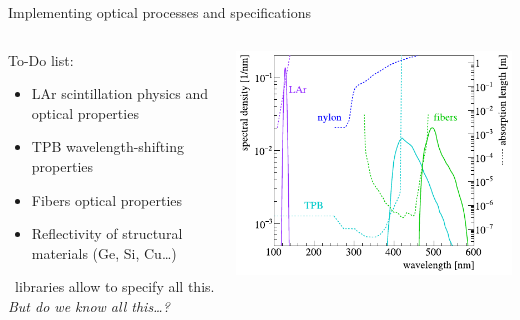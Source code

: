 \documentclass[10pt,aspectratio=169]{beamer}
\begin{document}
\begin{frame}{Implementing optical processes and specifications}
  \begin{columns}
    \begin{column}{0.45\textwidth}\setlength{\parskip}{8pt}%
      To-Do list:
      \begin{itemize}
        \item LAr scintillation physics and optical properties
        \item TPB wavelength-shifting properties
        \item Fibers optical properties
        \item Reflectivity of structural materials (Ge, Si, Cu\ldots)
      \end{itemize}
      \geant\ libraries allow to specify all this. \emph{But do we know all
      this\ldots?}
    \end{column}
    \begin{column}{0.55\textwidth}
      \vspace*{0.5cm}
      \includegraphics[width=\columnwidth]{mage-specs.pdf}
    \end{column}
  \end{columns}
\end{frame}
\end{document}
